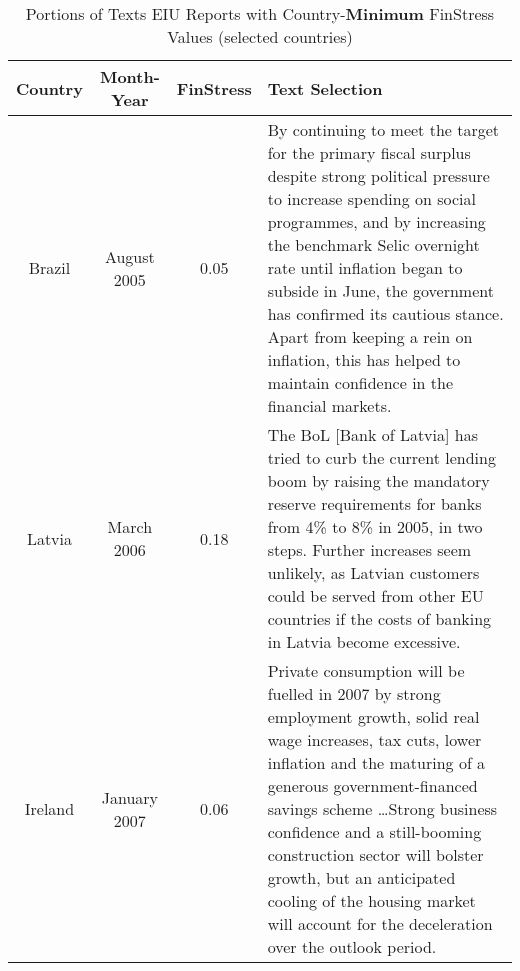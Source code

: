 \begin{table}
    \caption{Portions of Texts EIU Reports with Country-\textbf{Minimum} FinStress Values (selected countries)}
    \label{text_selections_min}
    	\begin{center}
        \begin{tabular}{c c c | m{10cm}}
            \hline
            Country & Month-Year & FinStress & Text Selection \\
            \hline\hline
            Brazil & August 2005 & 0.05 & By continuing to meet the target for the primary fiscal surplus despite strong political pressure to increase spending on social programmes, and by increasing the benchmark Selic overnight rate until inflation began to subside in June, the government has confirmed its cautious stance. Apart from keeping a rein on inflation, this has helped to maintain confidence in the financial markets. \\[0.5cm]

            Latvia & March 2006 & 0.18 & The BoL [Bank of Latvia] has tried to curb the current lending boom by raising the mandatory reserve requirements for banks from 4\% to 8\% in 2005, in two steps. Further increases seem unlikely, as Latvian customers could be served from other EU countries if the costs of banking in Latvia become excessive. \\[0.5cm]

            Ireland & January 2007 & 0.06 & Private consumption will be fuelled in 2007 by strong employment growth, solid real wage increases, tax cuts, lower inflation and the maturing of a generous government-financed savings scheme \ldots Strong business confidence and a still-booming construction sector will bolster growth, but an anticipated cooling of the housing market will account for the deceleration over the outlook period. \\[0.5cm]


            \hline
    \end{tabular}
    \end{center}
\end{table}
